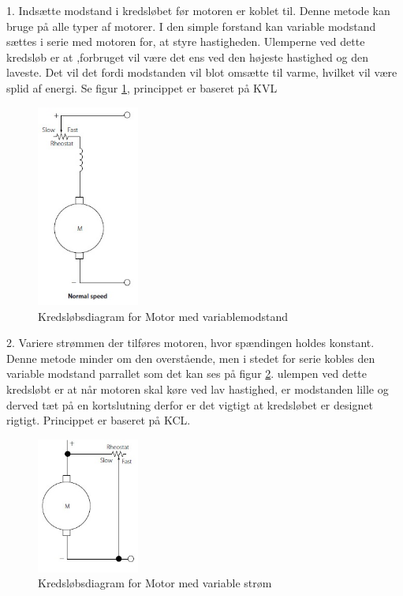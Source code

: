 1. Indsætte modstand i kredsløbet før motoren er koblet til.
Denne metode kan bruge på alle typer af motorer. I den simple forstand kan variable modstand sættes i serie med motoren for, at styre hastigheden. Ulemperne ved dette kredsløb er at ,forbruget vil være det ens ved den højeste hastighed og den laveste. Det vil det fordi modstanden vil blot omsætte til varme, hvilket vil være splid af energi. Se figur \ref{fig:motormodstand}, princippet er baseret på KVL

\begin{figure}[H]
	\centering
	\includegraphics[width=0.3\textwidth]{billeder/Hardware/motormodstand.jpg}
	\caption{Kredsløbsdiagram for Motor med variablemodstand}
	\label{fig:motormodstand}
\end{figure}

2. Variere strømmen der tilføres motoren, hvor spændingen holdes konstant.
Denne metode minder om den overstående, men i stedet for serie kobles den variable modstand parrallet som det kan ses på figur \ref{fig:motorcurrent}. ulempen ved dette kredsløbt er at når motoren skal køre ved lav hastighed, er modstanden lille og derved tæt på en kortslutning derfor er det vigtigt at kredsløbet er designet rigtigt. Princippet er baseret på KCL.
\begin{figure}[H]
	\centering
	\includegraphics[width=0.3\textwidth]{billeder/Hardware/motorcurrent.jpg}
	\caption{Kredsløbsdiagram for Motor med variable strøm}
	\label{fig:motorcurrent}
\end{figure}


